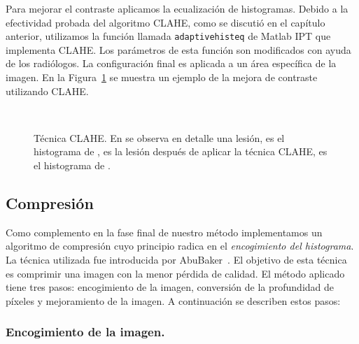 Para mejorar el contraste aplicamos la ecualización de histogramas. Debido a la
efectividad probada del algoritmo CLAHE, como se discutió en el capítulo
anterior, utilizamos la función llamada \texttt{adaptivehisteq} de Matlab IPT
que implementa CLAHE. Los parámetros de esta función son modificados con ayuda
de los radiólogos. La configuración final es aplicada a un área específica de
la imagen. En la Figura~\ref{img:clahe} se muestra un ejemplo de la mejora de
contraste utilizando CLAHE.

\begin{figure}[h!]
  \begin{center}
    \hspace{12pt}
    \\
    \hspace{12pt}
  \end{center}

  \caption[Técnica CLAHE]{Técnica CLAHE. En \protect{} se observa
  en detalle una lesión, \protect{} es el histograma de
  \protect{}, \protect{} es la lesión después de
  aplicar la técnica CLAHE, \protect{} es el histograma de
  \protect{}.}

  \label{img:clahe}
\end{figure}

\subsection{Compresión}
\label{compression}

Como complemento en la fase final de nuestro método implementamos un algoritmo
de compresión cuyo principio radica en el \textit{encogimiento del histograma}.
La técnica utilizada fue introducida por AbuBaker~\cite{abubaker2006mammogram,
abubaker2007efficient}. El objetivo de esta técnica es comprimir una imagen
con la menor pérdida de calidad. El método aplicado tiene tres pasos:
encogimiento de la imagen, conversión de la profundidad de píxeles y
mejoramiento de la imagen. A continuación se describen estos pasos:

\subsubsection{Encogimiento de la imagen.}

